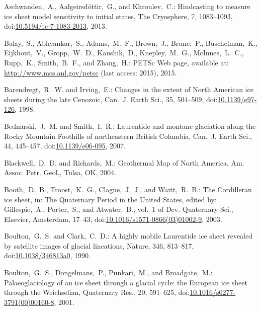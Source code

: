 \documentclass[tc, manuscript]{copernicus}
\begin{document}
\begin{thebibliography}{114}
 Aschwanden,~A., A{\dh}algeirsd\'{o}ttir,~G., and Khroulev,~C.: Hindcasting to measure ice sheet model sensitivity to   initial states, The Cryosphere, 7, 1083--1093,
doi:\href{http://dx.doi.org/10.5194/tc-7-1083-2013}{10.5194/tc-7-1083-2013}, 2013.



Balay,~S., Abhyankar,~S., Adams,~M.~F., Brown,~J., Brune,~P., Buschelman,~K.,
Eijkhout,~V., Gropp,~W.~D., Kaushik,~D., Knepley,~M.~G., McInnes,~L.~C.,
Rupp,~K., Smith,~B.~F., and Zhang,~H.: {PETS}c {W}eb page, available at:
\url{http://www.mcs.anl.gov/petsc} (last access: 2015), 2015.


Barendregt,~R.~W. and Irving,~E.: Changes in the extent of North American ice sheets during the late Cenozoic, Can.~J. Earth Sci., 35, 504--509,
doi:\href{http://dx.doi.org/10.1139/e97-126}{10.1139/e97-126}, 1998.


Bednarski,~J.~M. and Smith,~I.~R.: Laurentide and montane glaciation along the Rocky Mountain Foothills of northeastern British Columbia, Can.~J. Earth Sci., 44, 445--457,
doi:\href{http://dx.doi.org/10.1139/e06-095}{10.1139/e06-095}, 2007.


Blackwell,~D.~D. and Richards,~M.: Geothermal Map of North America, Am. Assoc. Petr. Geol., Tulsa, OK, 2004.


Booth,~D.~B., Troost,~K.~G., Clague,~J.~J., and Waitt,~R.~B.: The Cordilleran ice sheet, in: The Quaternary Period in the United States, edited by: Gillespie,~A., Porter,~S., and Atwater,~B., vol.~1 of Dev. Quaternary Sci., Elsevier, Amsterdam, 17--43,
doi:\href{http://dx.doi.org/10.1016/s1571-0866(03)01002-9}{10.1016/s1571-0866(03)01002-9}, 2003.


Boulton,~G.~S. and Clark,~C.~D.: A highly mobile Laurentide ice sheet revealed by satellite images of glacial lineations, Nature, 346, 813--817,
doi:\href{http://dx.doi.org/10.1038/346813a0}{10.1038/346813a0}, 1990.


Boulton,~G.~S., Dongelmans,~P., Punkari,~M., and Broadgate,~M.: Palaeoglaciology of an ice sheet through a glacial cycle: the European ice sheet through the Weichselian, Quaternary Res., 20, 591--625,
doi:\href{http://dx.doi.org/10.1016/s0277-3791(00)00160-8}{10.1016/s0277-3791(00)00160-8}, 2001.



\end{thebibliography}
\end{document}
